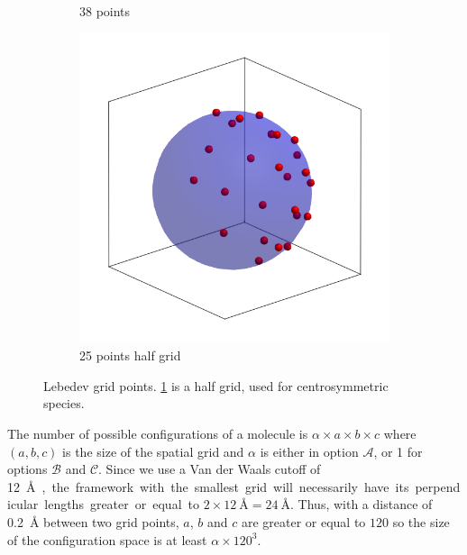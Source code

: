 \documentclass[main.tex]{subfiles}
\begin{document}
\begin{figure}
\begin{minipage}{0.55\linewidth}
\begin{subfigure}{0.5\linewidth}
			\caption{38 points}
		\end{subfigure}
	\end{minipage}%
	\begin{minipage}{0.45\linewidth}
		\begin{subfigure}{\linewidth}
			\centering
			\includegraphics[width=\linewidth]{figures/gcmc/lebedev_25_symm}
			\caption{25 points half grid}\label{fig:haldgridlebedev}
		\end{subfigure}
	\end{minipage}

	\caption{Lebedev grid points. \cref{fig:haldgridlebedev} is a half grid, used for centrosymmetric species.}\label{fig:lebedev}
\end{figure}

The number of possible configurations of a molecule is $\alpha\times a\times b\times c$ where $(a,b,c)$ is the size of the spatial grid and $\alpha$ is either \Nleb in option $\mathscr A$, or 1 for options $\mathscr B$ and $\mathscr C$. Since we use a Van der Waals cutoff of \qty{12}\angstrom, the framework with the smallest grid will necessarily have its perpendicular lengths greater or equal to $2\times\qty{12}\angstrom = \qty{24}\angstrom$. Thus, with a distance of \qty{0.2}{\angstrom} between two grid points, $a$, $b$ and $c$ are greater or equal to $120$ so the size of the configuration space is at least $\alpha\times120^3$.
\end{document}

